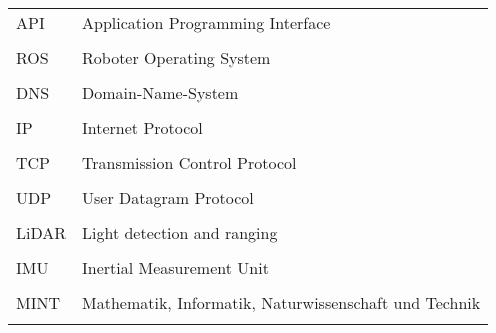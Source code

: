\documentclass[12pt,a4paper]{scrreprt}
\begin{document}
\begin{longtable}[l]{p{2cm} l}

API 				& Application Programming Interface                         \\
                    &                                                           \\
ROS 				& Roboter Operating System                                  \\
                    &                                                           \\
DNS                 & Domain-Name-System                                        \\
                    &                                                           \\
IP				    & Internet Protocol                                         \\
                    &                                                           \\
TCP				    & Transmission Control Protocol                             \\
                    &                                                           \\
UDP				    & User Datagram Protocol                                    \\
                    &                                                           \\
LiDAR               & Light detection and ranging                               \\
                    &                                                           \\
IMU                 & Inertial Measurement Unit                                 \\
                    &                                                           \\
MINT                &  Mathematik, Informatik, Naturwissenschaft und Technik    \\
                    &                                                           \\


\end{longtable}
\end{document}
